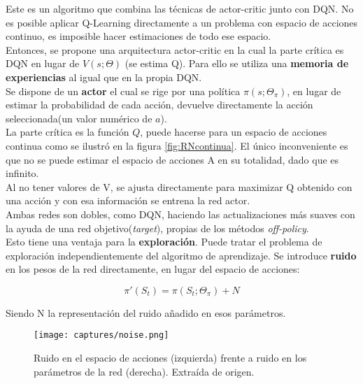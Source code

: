 \documentclass[11pt,fleqn]{book} %
\begin{document}
Este es un algoritmo que combina las técnicas de actor-critic junto con DQN. No es posible aplicar Q-Learning directamente a un problema con espacio de acciones continuo, es imposible hacer estimaciones de todo ese espacio. \\

Entonces, se propone una arquitectura actor-critic en la cual la parte crítica es DQN en lugar de $V(s;\Theta)$ (se estima Q). Para ello se utiliza una \textbf{memoria de experiencias} al igual que en la propia DQN. \\

Se dispone de un \textbf{actor} el cual se rige por una política $\pi(s;\Theta_\pi)$, en lugar de estimar la probabilidad de cada acción, devuelve directamente la acción seleccionada(un valor numérico de $a$). \\

La parte crítica es la función $Q$, puede hacerse para un espacio de acciones continua como se ilustró en la figura \ref{fig:RNcontinua}. El único inconveniente es que no se puede estimar el espacio de acciones A en su totalidad, dado que es infinito. \\

Al no tener valores de V, se ajusta directamente para maximizar Q obtenido con una acción y con esa información se entrena la red actor. \\

Ambas redes son dobles, como DQN, haciendo las actualizaciones más suaves con la ayuda de una red objetivo(\textit{target}), propias de los métodos \textit{off-policy}.\\

Esto tiene una ventaja para la \textbf{exploración}. Puede tratar el problema de exploración independientemente del algoritmo de aprendizaje. Se introduce \textbf{ruido} en los pesos de la red directamente, en lugar del espacio de acciones:

\begin{equation*}
\pi'(S_t)=\pi(S_t;\Theta_\pi)+N
\end{equation*}

Siendo N la representación del ruido añadido en esos parámetros.\\

\begin{figure}[H]
	\centering\texttt{[image: captures/noise.png]}
	\caption{Ruido en el espacio de acciones (izquierda) frente a ruido en los parámetros de la red (derecha). Extraída de origen. \cite{article:DDPG_2}}
	\label{fig:noise} %
\end{figure}
\end{document}
